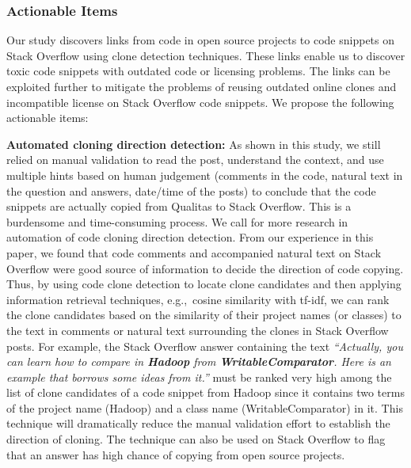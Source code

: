 \documentclass[10pt,journal,compsoc]{IEEEtran}
\begin{document}
\subsubsection{Actionable Items}
Our study discovers links from code in open source projects to code snippets on
Stack Overflow using clone detection techniques. These links enable us to
discover toxic code snippets with outdated code or licensing problems. 
The links can be exploited further to mitigate the problems of reusing outdated online clones and
incompatible license on Stack Overflow code snippets. We propose the following
actionable items: 

\textbf{Automated cloning direction detection:} 
As shown in this study, we still relied on manual
validation to read the post, understand the context, and use multiple hints
based on human judgement (comments in the code, natural text in the question and
answers, date/time of the posts) to conclude that the code snippets are actually
copied from Qualitas to Stack Overflow. This is a burdensome and time-consuming process. We call for more research in
automation of code cloning direction detection. From our experience in this
paper, we found that code comments and accompanied natural text
on Stack Overflow were good source of information to decide the direction of
code copying. Thus, by using code clone detection to locate clone candidates
and then applying information retrieval techniques, e.g.,~cosine similarity with tf-idf, 
we can rank the clone candidates based on the similarity of their project names (or classes) to the text in 
comments or natural text surrounding the clones in Stack Overflow posts.
For example, the Stack Overflow answer containing the text \textit{``Actually, you can learn how to compare in \textbf{Hadoop}
from \textbf{WritableComparator}. Here is an example that borrows some ideas from it.''}
must be ranked very high among the list of clone candidates of a code snippet
from Hadoop since it contains two terms of the project name (Hadoop) and a class name (WritableComparator)
in it.
This technique will dramatically reduce the manual validation effort to establish
the direction of cloning. The technique can also be used on Stack Overflow to 
flag that an answer has high chance of copying from open source projects.
\end{document}
